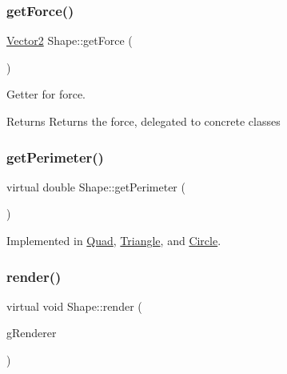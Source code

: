 \subsubsection{\texorpdfstring{getForce()}{getForce()}}
{\footnotesize\ttfamily \mbox{\hyperlink{struct_vector2}{Vector2}} Shape\+::get\+Force (\begin{DoxyParamCaption}{ }\end{DoxyParamCaption})\hspace{0.3cm}{\ttfamily [virtual]}}



Getter for force. 

\begin{DoxyReturn}{Returns}
Returns the force, delegated to concrete classes 
\end{DoxyReturn}
\mbox{\label{class_shape_a3918812ff3a143dabbeba2f650fb5e7c}} 
\subsubsection{\texorpdfstring{getPerimeter()}{getPerimeter()}}
{\footnotesize\ttfamily virtual double Shape\+::get\+Perimeter (\begin{DoxyParamCaption}{ }\end{DoxyParamCaption})\hspace{0.3cm}{\ttfamily [pure virtual]}}



Implemented in \mbox{\hyperlink{class_quad_a8d438e2844a4a155ed61addfab1a2868}{Quad}}, \mbox{\hyperlink{class_triangle_a692f12975e5a86c757f9d73c0228070e}{Triangle}}, and \mbox{\hyperlink{class_circle_afee5f4743c89e48e462e5f56aa605669}{Circle}}.

\mbox{\label{class_shape_a07881321ba401e7cdbd83b4f2b009e37}} 
\subsubsection{\texorpdfstring{render()}{render()}}
{\footnotesize\ttfamily virtual void Shape\+::render (\begin{DoxyParamCaption}\item[{S\+D\+L\+\_\+\+Renderer $\ast$}]{g\+Renderer }\end{DoxyParamCaption})\hspace{0.3cm}{\ttfamily [pure virtual]}}



